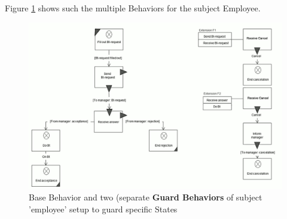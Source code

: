Figure \ref{fig:extension1} shows such the multiple Behaviors for the subject Employee. 

\begin{figure}[htbp]
	\centering
	\includegraphics[width=0.7\linewidth]{Figures/Ontology/SubjectBehavior/Extension}
	\caption[Base Behavior and two (separate \textbf{Guard Behaviors} of subject 'employee'.]{Base Behavior and two (separate \textbf{Guard Behaviors} of subject 'employee' setup to guard specific States}
	\label{fig:extension1}
\end{figure}






